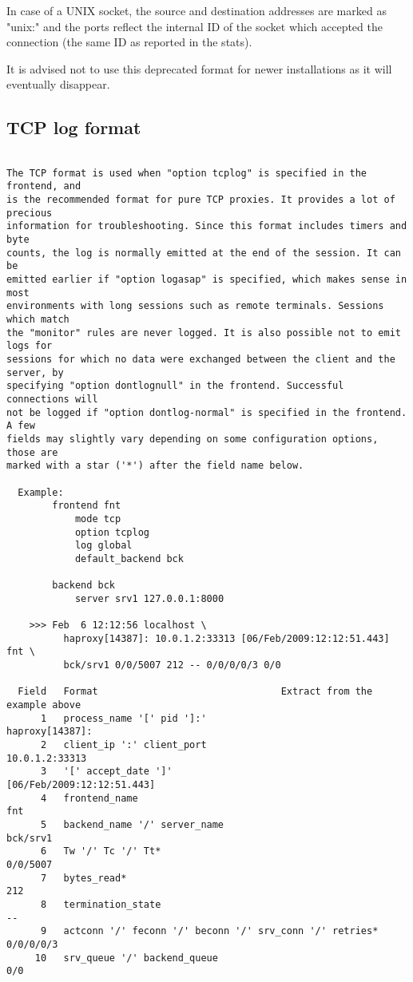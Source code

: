 In case of a UNIX socket, the source and destination addresses are marked as
"unix:" and the ports reflect the internal ID of the socket which accepted the
connection (the same ID as reported in the stats).

It is advised not to use this deprecated format for newer installations as it
will eventually disappear.


\subsection{TCP log format}


\begin{verbatim}

The TCP format is used when "option tcplog" is specified in the frontend, and
is the recommended format for pure TCP proxies. It provides a lot of precious
information for troubleshooting. Since this format includes timers and byte
counts, the log is normally emitted at the end of the session. It can be
emitted earlier if "option logasap" is specified, which makes sense in most
environments with long sessions such as remote terminals. Sessions which match
the "monitor" rules are never logged. It is also possible not to emit logs for
sessions for which no data were exchanged between the client and the server, by
specifying "option dontlognull" in the frontend. Successful connections will
not be logged if "option dontlog-normal" is specified in the frontend. A few
fields may slightly vary depending on some configuration options, those are
marked with a star ('*') after the field name below.

  Example:
        frontend fnt
            mode tcp
            option tcplog
            log global
            default_backend bck

        backend bck
            server srv1 127.0.0.1:8000

    >>> Feb  6 12:12:56 localhost \
          haproxy[14387]: 10.0.1.2:33313 [06/Feb/2009:12:12:51.443] fnt \
          bck/srv1 0/0/5007 212 -- 0/0/0/0/3 0/0

  Field   Format                                Extract from the example above
      1   process_name '[' pid ']:'                            haproxy[14387]:
      2   client_ip ':' client_port                             10.0.1.2:33313
      3   '[' accept_date ']'                       [06/Feb/2009:12:12:51.443]
      4   frontend_name                                                    fnt
      5   backend_name '/' server_name                                bck/srv1
      6   Tw '/' Tc '/' Tt*                                           0/0/5007
      7   bytes_read*                                                      212
      8   termination_state                                                 --
      9   actconn '/' feconn '/' beconn '/' srv_conn '/' retries*    0/0/0/0/3
     10   srv_queue '/' backend_queue                                      0/0


\end{verbatim}
